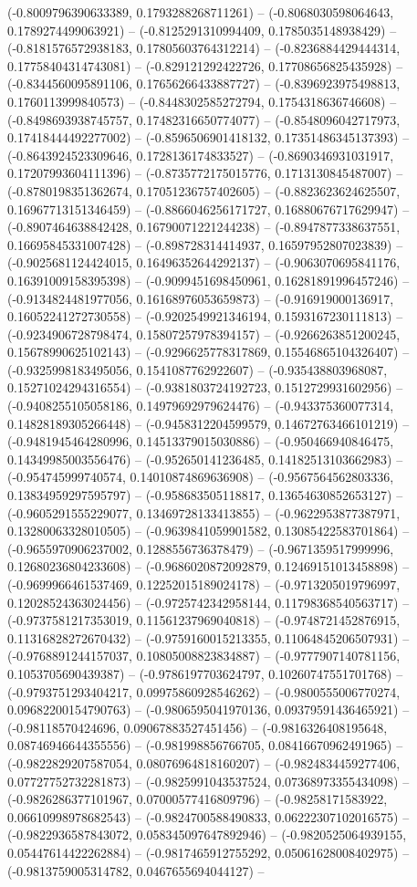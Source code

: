 (-0.8009796390633389, 0.1793288268711261) -- (-0.8068030598064643, 0.1789274499063921) -- (-0.8125291310994409, 0.1785035148938429) -- (-0.8181576572938183, 0.17805603764312214) -- (-0.8236884429444314, 0.17758404314743081) -- (-0.829121292422726, 0.17708656825435928) -- (-0.8344560095891106, 0.17656266433887727) -- (-0.8396923975498813, 0.1760113999840573) -- (-0.8448302585272794, 0.1754318636746608) -- (-0.8498693938745757, 0.17482316650774077) -- (-0.8548096042717973, 0.17418444492277002) -- (-0.8596506901418132, 0.17351486345137393) -- (-0.8643924523309646, 0.1728136174833527) -- (-0.8690346931031917, 0.17207993604111396) -- (-0.8735772175015776, 0.1713130845487007) -- (-0.8780198351362674, 0.17051236757402605) -- (-0.8823623624625507, 0.16967713151346459) -- (-0.8866046256171727, 0.16880676717629947) -- (-0.8907464638842428, 0.16790071221244238) -- (-0.8947877338637551, 0.16695845331007428) -- (-0.898728314414937, 0.16597952807023839) -- (-0.9025681124424015, 0.16496352644292137) -- (-0.9063070695841176, 0.16391009158395398) -- (-0.9099451698450961, 0.16281891996457246) -- (-0.9134824481977056, 0.16168976053659873) -- (-0.916919000136917, 0.16052241272730558) -- (-0.9202549921346194, 0.1593167230111813) -- (-0.9234906728798474, 0.15807257978394157) -- (-0.9266263851200245, 0.15678990625102143) -- (-0.9296625778317869, 0.15546865104326407) -- (-0.9325998183495056, 0.1541087762922607) -- (-0.935438803968087, 0.15271024294316554) -- (-0.9381803724192723, 0.1512729931602956) -- (-0.9408255105058186, 0.14979692979624476) -- (-0.943375360077314, 0.14828189305266448) -- (-0.9458312204599579, 0.14672763466101219) -- (-0.9481945464280996, 0.14513379015030886) -- (-0.950466940846475, 0.14349985003556476) -- (-0.952650141236485, 0.14182513103662983) -- (-0.954745999740574, 0.14010874869636908) -- (-0.9567564562803336, 0.13834959297595797) -- (-0.958683505118817, 0.13654630852653127) -- (-0.9605291555229077, 0.13469728133413855) -- (-0.9622953877387971, 0.13280063328010505) -- (-0.9639841059901582, 0.13085422583701864) -- (-0.9655970906237002, 0.1288556736378479) -- (-0.9671359517999996, 0.12680236804233608) -- (-0.9686020872092879, 0.12469151013458898) -- (-0.9699966461537469, 0.12252015189024178) -- (-0.9713205019796997, 0.12028524363024456) -- (-0.9725742342958144, 0.11798368540563717) -- (-0.9737581217353019, 0.11561237969040818) -- (-0.9748721452876915, 0.11316828272670432) -- (-0.9759160015213355, 0.11064845206507931) -- (-0.9768891244157037, 0.10805008823834887) -- (-0.9777907140781156, 0.1053705690439387) -- (-0.9786197703624797, 0.10260747551701768) -- (-0.9793751293404217, 0.09975860928546262) -- (-0.9800555006770274, 0.09682200154790763) -- (-0.9806595041970136, 0.09379591436465921) -- (-0.98118570424696, 0.09067883527451456) -- (-0.9816326408195648, 0.08746946644355556) -- (-0.981998856766705, 0.08416670962491965) -- (-0.9822829207587054, 0.08076964818160207) -- (-0.9824834459277406, 0.07727752732281873) -- (-0.9825991043537524, 0.07368973355434098) -- (-0.9826286377101967, 0.07000577416809796) -- (-0.98258171583922, 0.06610998978682543) -- (-0.9824700588490833, 0.06222307102016575) -- (-0.9822936587843072, 0.058345097647892946) -- (-0.9820525064939155, 0.05447614422262884) -- (-0.9817465912755292, 0.05061628008402975) -- (-0.9813759005314782, 0.0467655694044127) -- 